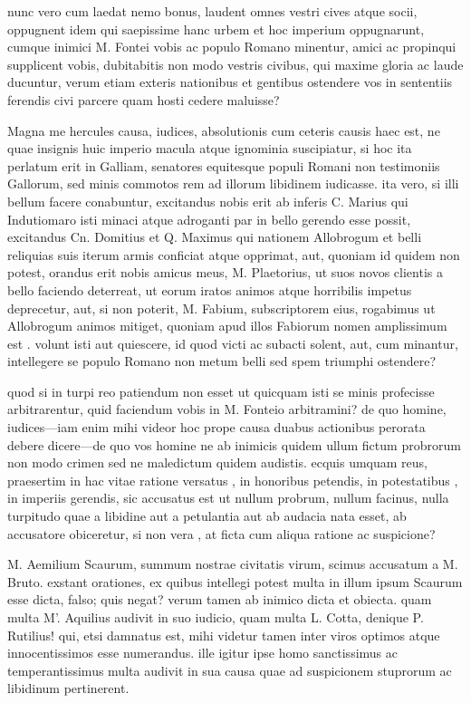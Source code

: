  nunc vero cum laedat nemo bonus, laudent omnes vestri cives atque socii, oppugnent idem qui saepissime hanc urbem et hoc imperium oppugnarunt, cumque inimici M. Fontei vobis ac populo Romano minentur, amici ac propinqui supplicent vobis, dubitabitis non modo vestris civibus, qui maxime gloria ac laude ducuntur, verum etiam exteris nationibus et gentibus ostendere vos in sententiis ferendis civi parcere quam hosti cedere maluisse?

 Magna me hercules causa, iudices, absolutionis cum ceteris causis haec est, ne quae insignis huic imperio macula atque ignominia suscipiatur, si hoc ita perlatum erit in Galliam, senatores equitesque populi Romani non testimoniis Gallorum, sed minis commotos rem ad illorum libidinem iudicasse. ita vero, si illi bellum facere conabuntur, excitandus nobis erit ab inferis C. Marius qui Indutiomaro isti minaci atque adroganti par in bello gerendo esse possit, excitandus Cn. Domitius et Q. Maximus qui nationem Allobrogum et belli reliquias suis iterum armis conficiat atque opprimat, aut, quoniam id quidem non potest, orandus erit nobis amicus meus, M. Plaetorius, ut suos novos clientis a bello faciendo deterreat, ut eorum iratos animos atque horribilis impetus deprecetur, aut, si non poterit, M. Fabium, subscriptorem eius, rogabimus ut Allobrogum animos mitiget, quoniam apud illos Fabiorum nomen amplissimum est . volunt isti aut quiescere, id quod victi ac subacti solent, aut, cum minantur, intellegere se populo Romano non metum belli sed spem triumphi ostendere?

 quod si in turpi reo patiendum non esset ut quicquam isti se minis profecisse arbitrarentur, quid faciendum vobis in M. Fonteio arbitramini? de quo homine, iudices—iam enim mihi videor hoc prope causa duabus actionibus perorata debere dicere—de quo vos homine ne ab inimicis quidem ullum fictum probrorum non modo crimen sed ne maledictum quidem audistis. ecquis umquam reus, praesertim in hac vitae ratione versatus , in honoribus petendis, in potestatibus , in imperiis gerendis, sic accusatus est ut nullum probrum, nullum facinus, nulla turpitudo quae a libidine aut a petulantia aut ab audacia nata esset, ab accusatore obiceretur, si non vera , at ficta cum aliqua ratione ac suspicione?

 M. Aemilium Scaurum, summum nostrae civitatis virum, scimus accusatum a M. Bruto. exstant orationes, ex quibus intellegi potest multa in illum ipsum Scaurum esse dicta, falso; quis negat? verum tamen ab inimico dicta et obiecta. quam multa M'. Aquilius audivit in suo iudicio, quam multa L. Cotta, denique P. Rutilius! qui, etsi damnatus est, mihi videtur tamen inter viros optimos atque innocentissimos esse numerandus. ille igitur ipse homo sanctissimus ac temperantissimus multa audivit in sua causa quae ad suspicionem stuprorum ac libidinum pertinerent.

